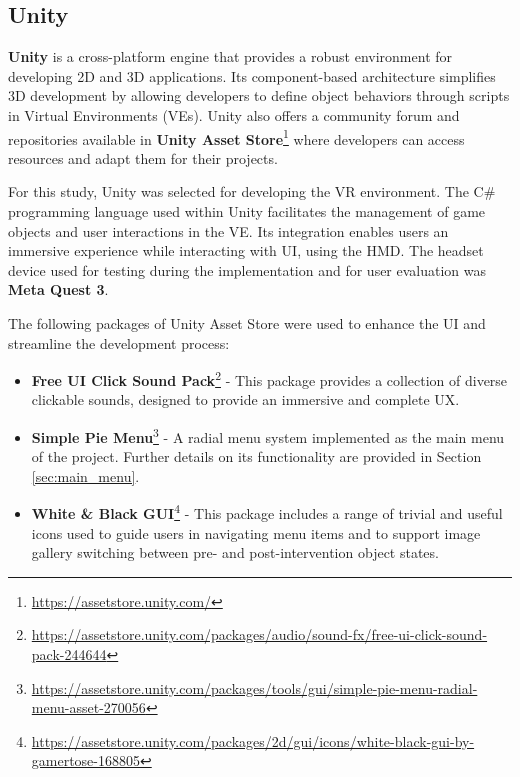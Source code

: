 \subsection{Unity}
\textbf{Unity} is a cross-platform engine that provides a robust environment for developing \gls{2D} and \gls{3D} applications. 
Its component-based architecture simplifies \gls{3D} development by allowing developers to define object behaviors through scripts in Virtual Environments (\glspl{VE}).
Unity also offers a community forum and repositories available in \textbf{Unity Asset Store}\footnote{\url{https://assetstore.unity.com/}} where developers can access resources and adapt them for their projects.

For this study, Unity was selected for developing the \gls{VR} environment. The C\# programming language used within Unity facilitates the management of game objects and user interactions in the \gls{VE}.
Its integration enables users an immersive experience while interacting with \gls{UI}, using the \gls{HMD}. 
The headset device used for testing during the implementation and for user evaluation was \textbf{Meta Quest 3}.

The following packages of Unity Asset Store were used to enhance the \gls{UI} and streamline the development process:

\begin{itemize}
\item{\textbf{Free UI Click Sound Pack}\footnote{\url{https://assetstore.unity.com/packages/audio/sound-fx/free-ui-click-sound-pack-244644}} - This package provides a collection of diverse clickable sounds, designed to provide an immersive and complete \gls{UX}.}
\item{\textbf{Simple Pie Menu}\footnote{\url{https://assetstore.unity.com/packages/tools/gui/simple-pie-menu-radial-menu-asset-270056}}} - A radial menu system implemented as the main menu of the project. Further details on its functionality are provided in Section \ref{sec:main_menu}.
\item{\textbf{White \& Black GUI}\footnote{\url{https://assetstore.unity.com/packages/2d/gui/icons/white-black-gui-by-gamertose-168805}}} - This package includes a range of trivial and useful icons used to guide users in navigating menu items and to support image gallery switching between pre- and post-intervention object states.
\end{itemize}


